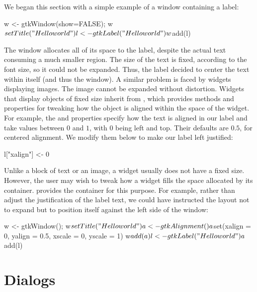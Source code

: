 We began this section with a simple example of a window containing a
label:

\begin{Schunk}
\begin{Sinput}
 w <- gtkWindow(show=FALSE); w$setTitle("Hello world")
 l <- gtkLabel("Hello world")
 w$add(l)
\end{Sinput}
\end{Schunk}
%
The window allocates all of its space to the label, despite the actual
text consuming a much smaller region. The size of the text is fixed,
according to the font size, so it could not be expanded. Thus, the
label decided to center the text within itself (and thus the
window). A similar problem is faced by widgets displaying images. The
image cannot be expanded without distortion. Widgets that display
objects of fixed size inherit from , which provides
methods and properties for tweaking how the object is aligned within
the space of the widget. For example, the  and
 properties specify how the text is aligned in our label
and take values between $0$ and $1$, with $0$ being left and
top. Their defaults are $0.5$, for centered alignment. We modify them
below to make our label left justified:
\begin{Schunk}
\begin{Sinput}
 l["xalign"] <- 0
\end{Sinput}
\end{Schunk}

Unlike a block of text or an image, a widget usually does not have a
fixed size. However, the user may wish to tweak how a widget fills
the space allocated by its container.  \GTK\/ provides the
 container for this purpose. For example, rather
than adjust the justification of the label text, we could have
instructed the layout not to expand but to position itself against the
left side of the window:
\begin{Schunk}
\begin{Sinput}
 w <- gtkWindow(); w$setTitle("Hello world")
 a <- gtkAlignment()
 a$set(xalign = 0, yalign = 0.5, xscale = 0, yscale = 1)
 w$add(a)
 l <- gtkLabel("Hello world")
 a$add(l)
\end{Sinput}
\end{Schunk}

\section{Dialogs}
\label{sec:dialogs}

